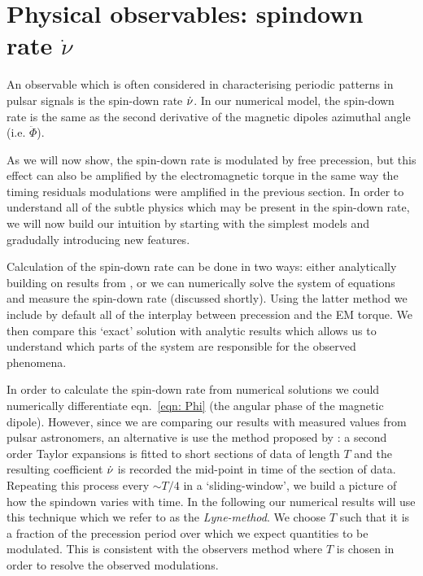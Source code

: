 \documentclass[../full_thesis/full_thesis.tex]{subfiles}
\begin{document}

\section{Physical observables: spindown rate $\dot{\nu}$}
An observable which is often considered in characterising periodic patterns in
pulsar signals is the spin-down rate $\dot{\nu}$. In our numerical model, the
spin-down rate is the same as the second derivative of the magnetic dipoles
azimuthal angle (i.e. $\ddot{\Phi}$).

As we will now show, the spin-down rate is modulated by free precession, but
this effect can also be amplified by the electromagnetic torque in the same way
the timing residuals modulations were amplified in the previous section.
In order to understand all of the subtle physics which
may be present in the spin-down rate, we will now build our intuition by starting
with the simplest models and gradudally introducing new features.

Calculation of the spin-down rate can be done in two ways: either analytically
building on results from \citet{Jones2001}, or we can numerically solve the
system of equations and measure the spin-down rate (discussed shortly). Using the
latter method we include by default all of the interplay between precession and
the EM torque. We then compare this `exact' solution with analytic results
which allows us to understand which parts of the system are responsible for the
observed phenomena.

In order to calculate the spin-down rate from numerical solutions we could
numerically differentiate eqn.~\eqref{eqn: Phi} (the angular phase of the
magnetic dipole). However, since we are comparing our results with measured
values from pulsar astronomers, an alternative is use the method proposed by
\citet{Lyne2010}: a second order Taylor expansions is fitted to short sections
of data of length $T$ and the resulting coefficient $\dot{\nu}$ is recorded the
mid-point in time of the section of data. Repeating this process every $\sim
T/4$ in a `sliding-window', we build a picture of how the spindown varies with time.
In the following our numerical results will use this technique which we refer
to as the \emph{Lyne-method}.
We choose $T$ such that it is a fraction of the precession period over which we
expect quantities to be modulated. This is consistent with the observers method
where $T$ is chosen in order to resolve the observed modulations.
\end{document}
